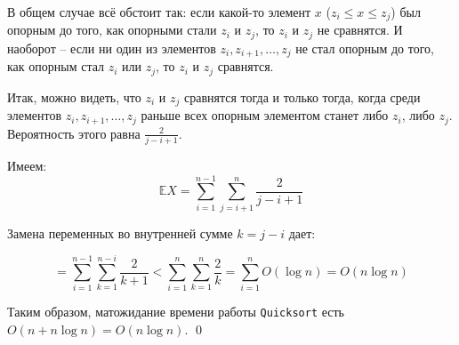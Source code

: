 В общем случае всё обстоит так: если какой-то элемент $x$ ($z_i \leq x \leq z_j$) был опорным до того, как опорными стали $z_i$ и $z_j$, то $z_i$ и $z_j$ не сравнятся. И наоборот -- если ни один из элементов $z_i, z_{i+1},\ldots, z_j$ не стал опорным до того, как опорным стал $z_i$ или $z_j$, то $z_i$ и $z_j$ сравнятся.

Итак, можно видеть, что $z_i$ и $z_j$ сравнятся тогда и только тогда, когда среди элементов $z_i, z_{i+1}, \ldots, z_j$ раньше всех опорным элементом станет либо $z_i$, либо $z_j$. Вероятность этого равна $\frac{2}{j-i+1}$.

Имеем: $$\mathbb E X = \sum_{i=1}^{n-1} \sum_{j=i+1}^n \frac{2}{j-i+1}$$

Замена переменных во внутренней сумме $k = j-i$ дает:

$$ = \sum_{i=1}^{n-1} \sum_{k=1}^{n-i} \frac{2}{k+1} < \sum_{i=1}^n \sum_{k=1}^n \frac{2}{k} = \sum_{i=1}^n O(\log n) = O(n \log n)$$

Таким образом, матожидание времени работы \texttt{Quicksort} есть $O(n+n\log n) = O(n\log n)$. \qed

